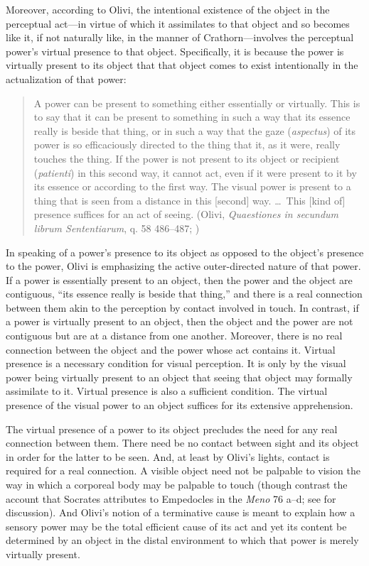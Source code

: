 Moreover, according to Olivi, the intentional existence of the object in the perceptual act---in virtue of which it assimilates to that object and so becomes like it, if not naturally like, in the manner of Crathorn---involves the perceptual power's virtual presence to that object. Specifically, it is because the power is virtually present to its object that that object comes to exist intentionally in the actualization of that power: 
\begin{quote}
	A power can be present to something either essentially or virtually. This is to say that it can be present to something in such a way that its essence really is beside that thing, or in such a way that the gaze (\emph{aspectus}) of its power is so efficaciously directed to the thing that it, as it were, really touches the thing. If the power is not present to its object or recipient (\emph{patienti}) in this second way, it cannot act, even if it were present to it by its essence or according to the first way. The visual power is present to a thing that is seen from a distance in this [second] way. \dots\ This [kind of] presence suffices for an act of seeing. (Olivi, \emph{Quaestiones in secundum librum Sententiarum}, q. 58 486--487; \citealt[151--152]{Toivanen:2013ul})
\end{quote}
In speaking of a power's presence to its object as opposed to the object's presence to the power, Olivi is emphasizing the active outer-directed nature of that power. If a power is essentially present to an object, then the power and the object are contiguous, ``its essence really is beside that thing,'' and there is a real connection between them akin to the perception by contact involved in touch. In contrast, if a power is virtually present to an object, then the object and the power are not contiguous but are at a distance from one another. Moreover, there is no real connection between the object and the power whose act contains it. Virtual presence is a necessary condition for visual perception. It is only by the visual power being virtually present to an object that seeing that object may formally assimilate to it. Virtual presence is also a sufficient condition. The virtual presence of the visual power to an object suffices for its extensive apprehension. 

The virtual presence of a power to its object precludes the need for any real connection between them. There need be no contact between sight and its object in order for the latter to be seen. And, at least by Olivi's lights, contact is required for a real connection. A visible object need not be palpable to vision the way in which a corporeal body may be palpable to touch (though contrast the account that Socrates attributes to Empedocles in the \emph{Meno} 76 a--d; see \citealt[chapter 1.2]{Kalderon:2015fr} for discussion). And Olivi's notion of a terminative cause is meant to explain how a sensory power may be the total efficient cause of its act and yet its content be determined by an object in the distal environment to which that power is merely virtually present.


